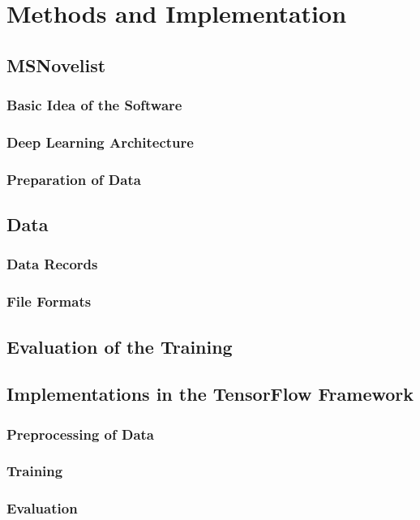 \documentclass[12pt,a4paper]{report}
\begin{document}
\chapter{Methods and Implementation}
\section{MSNovelist}
\subsection{Basic Idea of the Software}
\subsection{Deep Learning Architecture}
\subsection{Preparation of Data}

\section{Data}
\subsection{Data Records}
\subsection{File Formats}

\section{Evaluation of the Training}

\section{Implementations in the TensorFlow Framework}
\subsection{Preprocessing of Data}
\subsection{Training}
\subsection{Evaluation}
\end{document}
